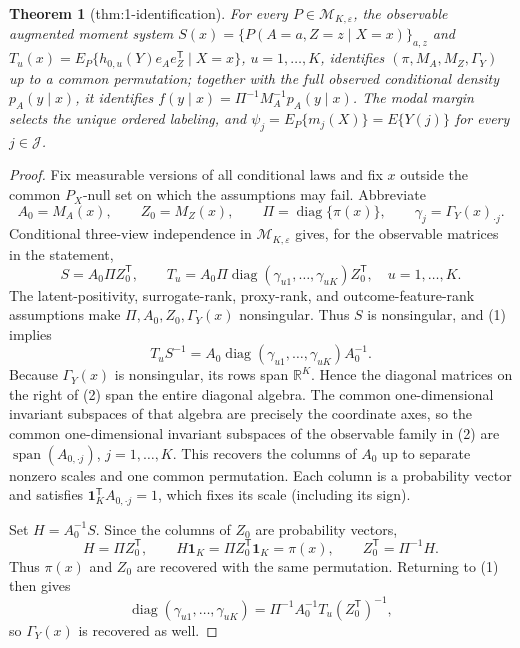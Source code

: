 \documentclass{article}
\newtheorem{theorem}{Theorem}
\begin{document}
\begin{theorem}[thm:1-identification]\label{thm:1-identification}
For every \(P\in\mathcal M_{K,\varepsilon}\), the observable augmented moment system \(S(x)=\{P(A=a,Z=z\mid X=x)\}_{a,z}\) and \(T_u(x)=E_P\{h_{0,u}(Y)e_Ae_Z^{\mathsf T}\mid X=x\}\), \(u=1,\ldots,K\), identifies \((\pi,M_A,M_Z,\Gamma_Y)\) up to a common permutation; together with the full observed conditional density \(p_A(y\mid x)\), it identifies \(f(y\mid x)=\Pi^{-1}M_A^{-1}p_A(y\mid x)\). The modal margin selects the unique ordered labeling, and \(\psi_j=E_P\{m_j(X)\}=E\{Y(j)\}\) for every \(j\in\mathcal J\).
\end{theorem}
\begin{proof}
Fix measurable versions of all conditional laws and fix \(x\) outside the common \(P_X\)-null set on which the assumptions may fail.  Abbreviate
\[
A_0=M_A(x),\qquad Z_0=M_Z(x),\qquad \Pi=\operatorname{diag}\{\pi(x)\},
\qquad \gamma_j=\Gamma_Y(x)_{\cdot j}.
\]
Conditional three-view independence in \(\mathcal M_{K,\varepsilon}\) gives, for the observable matrices in the statement,
\[
S=A_0\Pi Z_0^{\mathsf T},\qquad
T_u=A_0\Pi\operatorname{diag}(\gamma_{u1},\ldots,\gamma_{uK})Z_0^{\mathsf T},
\quad u=1,\ldots,K. \tag{1}
\]
The latent-positivity, surrogate-rank, proxy-rank, and outcome-feature-rank assumptions make \(\Pi,A_0,Z_0,\Gamma_Y(x)\) nonsingular.  Thus \(S\) is nonsingular, and (1) implies
\[
T_uS^{-1}=A_0\operatorname{diag}(\gamma_{u1},\ldots,\gamma_{uK})A_0^{-1}. \tag{2}
\]
Because \(\Gamma_Y(x)\) is nonsingular, its rows span \(\mathbb R^K\).  Hence the diagonal matrices on the right of (2) span the entire diagonal algebra.  The common one-dimensional invariant subspaces of that algebra are precisely the coordinate axes, so the common one-dimensional invariant subspaces of the observable family in (2) are
\(\operatorname{span}(A_{0,\cdot j})\), \(j=1,\ldots,K\).  This recovers the columns of \(A_0\) up to separate nonzero scales and one common permutation.  Each column is a probability vector and satisfies \(\mathbf 1_K^{\mathsf T}A_{0,\cdot j}=1\), which fixes its scale (including its sign).

Set \(H=A_0^{-1}S\).  Since the columns of \(Z_0\) are probability vectors,
\[
H=\Pi Z_0^{\mathsf T},\qquad
H\mathbf 1_K=\Pi Z_0^{\mathsf T}\mathbf 1_K=\pi(x),\qquad
Z_0^{\mathsf T}=\Pi^{-1}H. \tag{3}
\]
Thus \(\pi(x)\) and \(Z_0\) are recovered with the same permutation.  Returning to (1) then gives
\[
\operatorname{diag}(\gamma_{u1},\ldots,\gamma_{uK})
=\Pi^{-1}A_0^{-1}T_u(Z_0^{\mathsf T})^{-1}, \tag{4}
\]
so \(\Gamma_Y(x)\) is recovered as well.


\end{proof}
\end{document}
